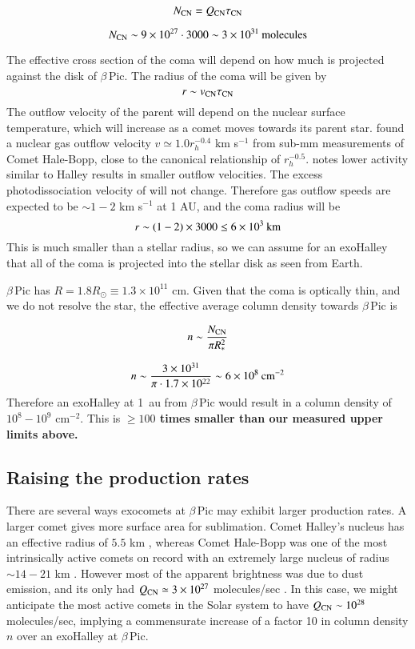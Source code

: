 \documentclass{aa}
\newcommand{\kms}{km s$^{-1}$}
\newcommand{\bp}{$\beta$\,Pic}
\begin{document}
$$N_{\ce{CN}}=Q_{\ce{CN}} \tau_{\ce{CN}}$$

$$N_{\ce{CN}}\sim 9\times10^{27} \cdot  3000 \sim 3\times10^{31}\:{\rm molecules}$$

The effective cross section of the coma will depend on how much is projected against the disk of \bp{}.
%
The radius of the  coma will be given by
$$r\sim v_{\ce{CN}} \tau_{\ce{CN}}$$
The outflow velocity of the parent  will depend on the nuclear surface temperature, which will increase as a comet moves towards its parent star.
%
\citet{Biver2002} found a nuclear gas outflow velocity $v\simeq1.0  r_h^{-0.4}$ \kms{} from sub-mm measurements of Comet Hale-Bopp, close to the canonical relationship of $r_h^{-0.5}$.
%
\citet{Harris2002} notes lower activity similar to Halley results in smaller outflow velocities.
%
The excess photodissociation velocity of  will not change.
%
Therefore gas outflow speeds are expected to be $\sim 1-2$ \kms{} at 1 AU, and the  coma radius will be
%
$$r\sim (1-2) \times 3000 \leq 6\times 10^{3}\:{\rm km}$$
%
This is much smaller than a stellar radius, so we can assume for an exoHalley that all of the coma is projected into the stellar disk as seen from Earth.

\bp{} has $R=1.8R_\odot\equiv 1.3\times 10^{11}$ cm.
%
Given that the coma is optically thin, and we do not resolve the star, the effective average column density towards \bp{} is 

$$n\sim\frac{N_{\ce{CN}}}{\pi R_*^2}$$

$$n\sim\frac{3\times10^{31}}{\pi\cdot 1.7\times10^{22}}\sim 6\times10^{8}\:{\rm cm^{-2}}$$
Therefore an exoHalley at 1~au from \bp{} would result in a  column density of $10^{8}-10^{9}$ cm$^{-2}$.
%
This is 
{\bf
$\geq100$ times smaller than our measured upper limits above.
}
\subsection{Raising the \texorpdfstring{}{CN} production rates}

There are several ways exocomets at \bp{} may exhibit larger  production rates.
%
A larger comet gives more surface area for sublimation.
%
 Comet Halley's nucleus has an effective radius of $5.5$ km \citep{Keller1987}, whereas Comet Hale-Bopp was one of the most intrinsically active comets on record with an extremely large nucleus of radius $\sim 14-21$ km \citep{Weaver1997}.
%
However most of the apparent brightness was due to dust emission, and its only had $Q_{\ce{CN}}\simeq 3\times10^{27}$ molecules/sec \citep{Schleicher2024}.
%
In this case, we might anticipate the most active comets in the Solar system to have $Q_{\ce{CN}}\sim 10^{28}$ molecules/sec, implying a commensurate increase of a factor 10 in column density $n$ over an exoHalley at \bp{}.
\end{document}
